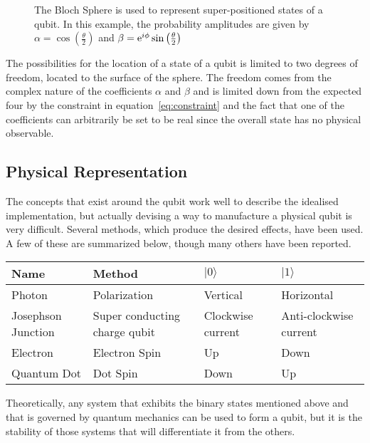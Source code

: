 \begin{figure}
	\centering
	\def\svgwidth{0.5\columnwidth}
	
	\caption{\label{fig:bloch}The Bloch Sphere is used to represent super-positioned states of a qubit. In this example, the probability amplitudes are given by $\alpha = \cos\left(\frac{\theta}{2}\right)$ and $\beta = \text{e}^{i\phi}\sin\left(\frac{\theta}{2}\right)$\cite{blochwiki}}
\end{figure}

The possibilities for the location of a state of a qubit is limited to two degrees of freedom, located to the surface of the sphere. The freedom comes from the complex nature of the coefficients $\alpha$ and $\beta$ and is limited down from the expected four by the constraint in equation~\ref{eq:constraint} and the fact that one of the coefficients can arbitrarily be set to be real since the overall state has no physical observable. 

\subsection{Physical Representation} The concepts that exist around the qubit work well to describe the idealised implementation, but actually devising a way to manufacture a physical qubit is very difficult. Several methods, which produce the desired effects, have been used. A few of these are summarized below, though many others have been reported.

\begin{table}
	\begin{tabular}{l|p{3cm}|l|l}
		Name & Method & $|0\rangle$ & $|1\rangle$ \\ \hline\hline
		Photon\cite{PhysRevLett.108.190505} & Polarization & Vertical & Horizontal\\ \hline
		Josephson Junction\cite{barone1982physics} & Super conducting charge qubit & Clockwise current & Anti-clockwise current \\ \hline
		Electron\cite{RevModPhys.79.1217}  & Electron Spin & Up & Down\\ \hline
		Quantum Dot\cite{PhysRevA.57.120} & Dot Spin & Down & Up\\ \hline
	\end{tabular}
\end{table}

Theoretically, any system that exhibits the binary states mentioned above and that is governed by quantum mechanics can be used to form a qubit, but it is the stability of those systems that will differentiate it from the others.

